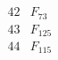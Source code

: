 \documentclass{article}
\begin{document}
{$$\begin{array}{|r|*{7}{r|}}
 & 
 & 
\\
\hline
42 
 &  F_{73}&
 & 
 & 
 & 
 & 
 & 
\\
\hline
43 
 &  F_{125}&
 & 
 & 
 & 
 & 
 & 
\\
\hline
44 
 & F_{115} &
 & 

\end{array}$$}
\end{document}
